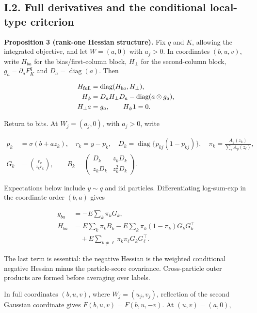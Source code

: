 \documentclass{article}
\begin{document}
\subsection*{I.2. Full derivatives and the conditional local-type
criterion}\label{full-derivatives}

\protect{}\label{full-hessian-criterion}
\textbf{Proposition 3 (rank-one Hessian structure).} Fix \(q\) and
\(K\), allowing the integrated objective, and let \(W=(a,0)\) with
\(a_j>0\). In coordinates \((b,u,v)\), write \(H_{ba}\) for the
bias/first-column block, \(H_\perp\) for the second-column block,
\(g_a=\partial_a F_K^q\) and \(D_a=\operatorname{diag}(a)\). Then

\[
\begin{aligned}
H_{\rm full}&=\operatorname{diag}(H_{ba},H_\perp),\\
H_\phi&=D_aH_\perp D_a-\operatorname{diag}(a\odot g_a),\\
H_\perp a&=g_a,\qquad H_\phi\mathbf1=0.
\end{aligned}
\]

Return to bits. At \(W_j=(a_j,0)\), with \(a_j>0\), write

\[
\begin{aligned}
p_k&=\sigma(b+az_k),\quad r_k=y-p_k,\quad D_k=\operatorname{diag}\{p_{kj}(1-p_{kj})\},
\quad\pi_k=\frac{A_y(z_k)}{\sum_\ell A_y(z_\ell)},\\
G_k&=\binom{r_k}{z_kr_k},\qquad
B_k=\begin{pmatrix}D_k&z_kD_k\\z_kD_k&z_k^2D_k\end{pmatrix}.
\end{aligned}
\tag{I.6}
\]

Expectations below include \(y\sim q\) and iid particles.
Differentiating log-sum-exp in the coordinate order \((b,a)\) gives

\[
\begin{aligned}
g_{ba}&=-E\sum_k\pi_kG_k,\\
H_{ba}&=E\sum_k\pi_kB_k-E\sum_k\pi_k(1-\pi_k)G_kG_k^\top\\
&\quad+E\sum_{k\ne\ell}\pi_k\pi_\ell G_kG_\ell^\top.
\end{aligned}
\tag{I.7}
\]

The last term is essential: the negative Hessian is the weighted
conditional negative Hessian minus the particle-score covariance.
Cross-particle outer products are formed before averaging over labels.

In full coordinates \((b,u,v)\), where \(W_j=(u_j,v_j)\), reflection of
the second Gaussian coordinate gives \(F(b,u,v)=F(b,u,-v)\). At
\((u,v)=(a,0)\),
\end{document}
